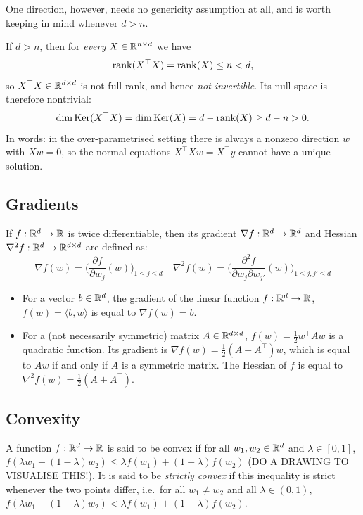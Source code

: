 One direction, however, needs no genericity assumption at all, and is worth keeping in mind whenever $d > n$.

\begin{lemma}
If $d > n$, then for \emph{every} $X \in \mathbb{R}^{n \times d}$ we have
\[
\operatorname{rank}(X^\top X) = \operatorname{rank}(X) \leq n < d,
\]
so $X^\top X \in \mathbb{R}^{d \times d}$ is not full rank, and hence \emph{not invertible}. Its null space is therefore nontrivial:
\[
\dim \mathrm{Ker}(X^\top X) = \dim \mathrm{Ker}(X) = d - \operatorname{rank}(X) \geq d - n > 0 .
\]
In words: in the over-parametrised setting there is always a nonzero direction $w$ with $X w = 0$, so the normal equations $X^\top X w = X^\top y$ cannot have a unique solution.
\end{lemma}


\subsection{Gradients}

If $f : \mathbb{R}^d \to \mathbb{R}$ is twice differentiable, then its gradient $\nabla f : \mathbb{R}^d \to \mathbb{R}^d$ and Hessian $\nabla^2 f : \mathbb{R}^d \to \mathbb{R}^{d \times d}$ are defined as:
\[\nabla f(w) = \Big ( \frac{\partial f}{\partial w_j}(w) \Big )_{1 \leq j \leq d} \quad \nabla^2 f(w) = \Big ( \frac{\partial^2 f}{\partial w_j \partial w_{j'}}(w) \Big )_{1 \leq j, j' \leq d} \]

\begin{itemize}
    \item For a vector $b \in \mathbb{R}^d$, the gradient of the linear function $f : \mathbb{R}^d \to \mathbb{R}$, $f(w) = \langle b , w \rangle $ is equal to $\nabla f(w) = b$.
    \item For a (not necessarily symmetric) matrix $A \in \mathbb{R}^{d \times d}$, $f(w) = \frac{1}{2} w^\top A w$ is a quadratic function. Its gradient is $\nabla f(w) = \frac{1}{2} (A + A^\top) w$, which is equal to $A w$ if and only if $A$ is a symmetric matrix. The Hessian of $f$ is equal to $\nabla^2 f(w) = \frac{1}{2} (A + A^\top)$.
\end{itemize}

\subsection{Convexity}
\label{sec:cheat-convexity}

A function $f:\mathbb{R}^d \to \mathbb{R}$ is said to be convex if for all $w_1, w_2 \in \mathbb{R}^d$ and $\lambda \in [0, 1]$, $f(\lambda w_1 + (1 - \lambda) w_2) \leq \lambda f(w_1) + (1 - \lambda) f(w_2)$ (DO A DRAWING TO VISUALISE THIS!). It is said to be \emph{strictly convex} if this inequality is strict whenever the two points differ, i.e.\ for all $w_1 \neq w_2$ and all $\lambda \in (0, 1)$, $f(\lambda w_1 + (1 - \lambda) w_2) < \lambda f(w_1) + (1 - \lambda) f(w_2)$.

